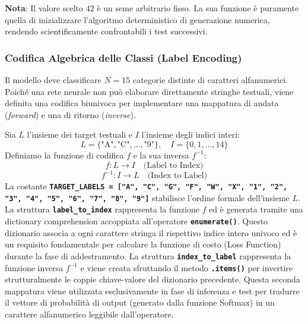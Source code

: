 \documentclass[12pt,a4paper]{article}
\begin{document}
    \textbf{Nota}: Il valore scelto $42$ è un seme arbitrario fisso. La sua funzione è puramente quella di inizializzare l'algoritmo deterministico di generazione numerica, rendendo scientificamente confrontabili i test successivi.

    \subsubsection{Codifica Algebrica delle Classi (Label Encoding)}
    Il modello deve classificare $N = 15$ categorie distinte di caratteri alfanumerici. Poiché una rete neurale non può elaborare direttamente stringhe testuali, viene definita una codifica biunivoca per implementare una mappatura di andata (\textit{forward}) e una di ritorno (\textit{inverse}).
    \smallskip

    Sia $L$ l'insieme dei target testuali e $I$ l'insieme degli indici interi:
    $$L = \{\text{"A"}, \text{"C"}, \dots, \text{"9"}\}, \quad I = \{0, 1, \dots, 14\}$$
    Definiamo la funzione di codifica $f$ e la sua inversa $f^{-1}$:
    $$f: L \rightarrow I \quad \text{(Label to Index)}$$
    $$f^{-1}: I \rightarrow L \quad \text{(Index to Label)}$$
    La costante \textbf{\texttt{TARGET\_LABELS = ["A", "C", "G", "F", "W", "X", "1", "2", "3", "4", "5", "6", "7", "8", "9"]}} stabilisce l'ordine formale dell'insieme $L$. \newline
    La struttura \textbf{\texttt{label\_to\_index}} rappresenta la funzione $f$ ed è generata tramite una dictionary comprehension accoppiata all'operatore \textbf{\texttt{enumerate()}}. Questo dizionario associa a ogni carattere stringa il rispettivo indice intero univoco ed è un requisito fondamentale per calcolare la funzione di costo (Loss Function) durante la fase di addestramento. \newline
    La struttura \textbf{\texttt{index\_to\_label}} rappresenta la funzione inversa $f^{-1}$ e viene creata sfruttando il metodo \textbf{\texttt{.items()}} per invertire strutturalmente le coppie chiave-valore del dizionario precedente. Questa seconda mappatura viene utilizzata esclusivamente in fase di inferenza e test per tradurre il vettore di probabilità di output (generato dalla funzione Softmax) in un carattere alfanumerico leggibile dall'operatore.
\end{document}
